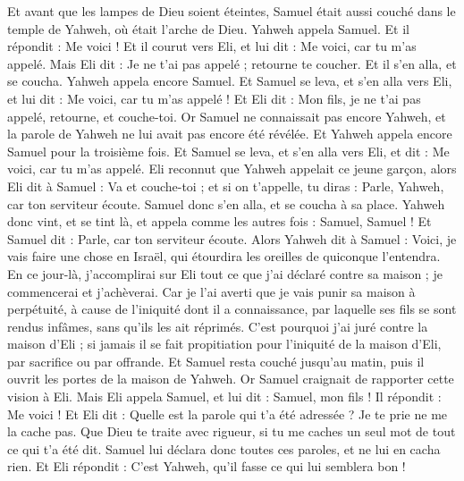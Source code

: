 \begin{multicols}{2}
Et avant que les lampes de Dieu soient éteintes, Samuel était aussi couché dans le temple de Yahweh, où était l'arche de Dieu.
Yahweh appela Samuel. Et il répondit : Me voici !
Et il courut vers Eli, et lui dit : Me voici, car tu m'as appelé. Mais Eli dit : Je ne t'ai pas appelé ; retourne te coucher. Et il s'en alla, et se coucha.
Yahweh appela encore Samuel. Et Samuel se leva, et s'en alla vers Eli, et lui dit : Me voici, car tu m'as appelé ! Et Eli dit : Mon fils, je ne t'ai pas appelé, retourne, et couche-toi.
Or Samuel ne connaissait pas encore Yahweh, et la parole de Yahweh ne lui avait pas encore été révélée.
Et Yahweh appela encore Samuel pour la troisième fois. Et Samuel se leva, et s'en alla vers Eli, et dit : Me voici, car tu m'as appelé. Eli reconnut que Yahweh appelait ce jeune garçon,
alors Eli dit à Samuel : Va et couche-toi ; et si on t'appelle, tu diras : Parle, Yahweh, car ton serviteur écoute. Samuel donc s'en alla, et se coucha à sa place.
Yahweh donc vint, et se tint là, et appela comme les autres fois : Samuel, Samuel ! Et Samuel dit : Parle, car ton serviteur écoute.
Alors Yahweh dit à Samuel : Voici, je vais faire une chose en Israël, qui étourdira les oreilles de quiconque l'entendra.
En ce jour-là, j'accomplirai sur Eli tout ce que j'ai déclaré contre sa maison ; je commencerai et j'achèverai.
Car je l'ai averti que je vais punir sa maison à perpétuité, à cause de l'iniquité dont il a connaissance, par laquelle ses fils se sont rendus infâmes, sans qu'ils les ait réprimés.
C'est pourquoi j'ai juré contre la maison d'Eli ; si jamais il se fait propitiation pour l'iniquité de la maison d'Eli, par sacrifice ou par offrande.
Et Samuel resta couché jusqu'au matin, puis il ouvrit les portes de la maison de Yahweh. Or Samuel craignait de rapporter cette vision à Eli.
Mais Eli appela Samuel, et lui dit : Samuel, mon fils ! Il répondit : Me voici !
Et Eli dit : Quelle est la parole qui t'a été adressée ? Je te prie ne me la cache pas. Que Dieu te traite avec rigueur, si tu me caches un seul mot de tout ce qui t'a été dit.
Samuel lui déclara donc toutes ces paroles, et ne lui en cacha rien. Et Eli répondit : C'est Yahweh, qu'il fasse ce qui lui semblera bon !

\end{multicols}
